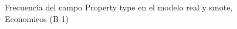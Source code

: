 \begin{figure}[H]
    \centering
    
    \caption{Frecuencia del campo Property type en el modelo real y smote, Economicos (B-1)}
    \label{frecuency-Property Type-smote-enc}
\end{figure}